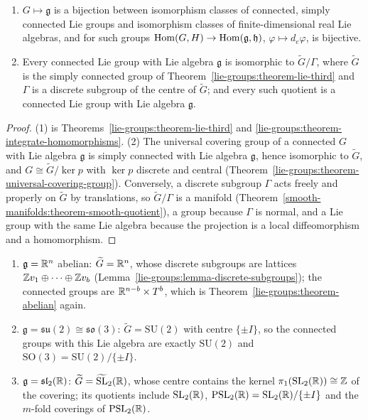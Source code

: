 \begin{corollary}\label{lie-groups:corollary-lie-correspondence}
\begin{enumerate}
\item $G \mapsto \mathfrak{g}$ is a bijection between isomorphism classes of connected, simply connected Lie groups and isomorphism classes of finite-dimensional real Lie
algebras, and for such groups $\operatorname{Hom}(G, H) \to \operatorname{Hom}(\mathfrak{g}, \mathfrak{h})$, $\varphi \mapsto d_e\varphi$, is bijective.
\item Every connected Lie group with Lie algebra $\mathfrak{g}$ is isomorphic to $\widetilde{G}/\Gamma$, where $\widetilde{G}$ is the simply connected group of
Theorem~\ref{lie-groups:theorem-lie-third} and $\Gamma$ is a discrete subgroup of the centre of $\widetilde{G}$; and every such quotient is a connected Lie group with
Lie algebra $\mathfrak{g}$.
\end{enumerate}
\end{corollary}

\begin{proof}
(1) is Theorems~\ref{lie-groups:theorem-lie-third} and \ref{lie-groups:theorem-integrate-homomorphisms}. (2) The universal covering group of a connected $G$ with Lie
algebra $\mathfrak{g}$ is simply connected with Lie algebra $\mathfrak{g}$, hence isomorphic to $\widetilde{G}$, and $G \cong \widetilde{G}/\ker p$ with $\ker p$ discrete and
central (Theorem~\ref{lie-groups:theorem-universal-covering-group}). Conversely, a discrete subgroup $\Gamma$ acts freely and properly on $\widetilde{G}$ by
translations, so $\widetilde{G}/\Gamma$ is a manifold (Theorem~\ref{smooth-manifolds:theorem-smooth-quotient}), a group because $\Gamma$ is normal, and a Lie group with
the same Lie algebra because the projection is a local diffeomorphism and a homomorphism.
\end{proof}

\begin{example}\label{lie-groups:example-lie-correspondence}
\begin{enumerate}
\item $\mathfrak{g} = \mathbb{R}^n$ abelian: $\widetilde{G} = \mathbb{R}^n$, whose discrete subgroups are lattices $\mathbb{Z} v_1 \oplus \cdots \oplus \mathbb{Z} v_b$ (Lemma~\ref{lie-groups:lemma-discrete-subgroups}); the
connected groups are $\mathbb{R}^{n-b} \times T^b$, which is Theorem~\ref{lie-groups:theorem-abelian} again.
\item $\mathfrak{g} = \mathfrak{su}(2) \cong \mathfrak{so}(3)$: $\widetilde{G} = \mathrm{SU}(2)$ with centre $\{\pm I\}$, so the connected groups with this Lie algebra are exactly
$\mathrm{SU}(2)$ and $\mathrm{SO}(3) = \mathrm{SU}(2)/\{\pm I\}$.
\item $\mathfrak{g} = \mathfrak{sl}_2(\mathbb{R})$: $\widetilde{G} = \widetilde{\mathrm{SL}}_2(\mathbb{R})$, whose centre contains the kernel $\pi_1(\mathrm{SL}_2(\mathbb{R})) \cong \mathbb{Z}$ of the covering; its quotients include
$\mathrm{SL}_2(\mathbb{R})$, $\mathrm{PSL}_2(\mathbb{R}) = \mathrm{SL}_2(\mathbb{R})/\{\pm I\}$ and the $m$-fold coverings of $\mathrm{PSL}_2(\mathbb{R})$.
\end{enumerate}
\end{example}

